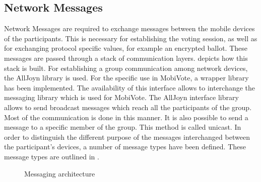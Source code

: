 \documentclass[numbers=noenddot, abstract=on, a4paper, headsepline,
footsepline, oneside, openright, draft=off, listof=leveldown]{scrreprt}
\begin{document}
\subsection{Network Messages}
Network Messages are required to exchange messages between the mobile devices of
the participants. This is necessary for establishing the voting session, as well
as for exchanging protocol specific values, for example an encrypted ballot.
These messages are passed through a stack of communication layers.
 depicts how this stack is built. For
establishing a group communication among network devices, the AllJoyn library is
used. For the specific use in MobiVote, a wrapper library has been implemented.
The availability of this interface allows to interchange the messaging library
which is used for MobiVote. The AllJoyn interface library allows to send
broadcast messages which reach all the participants of the group.
Most of the communication is done in this manner. It is also possible to send a
message to a specific member of the group. This method is called unicast. In
order to distinguish the different purpose of the messages interchanged between
the participant's devices, a number of message types have been defined. These
message types are outlined in .

 \begin{figure}[htbp]
	\centering
	\caption{Messaging architecture}
	\label{fig:messagingarchitecture}
\end{figure}
\end{document}
